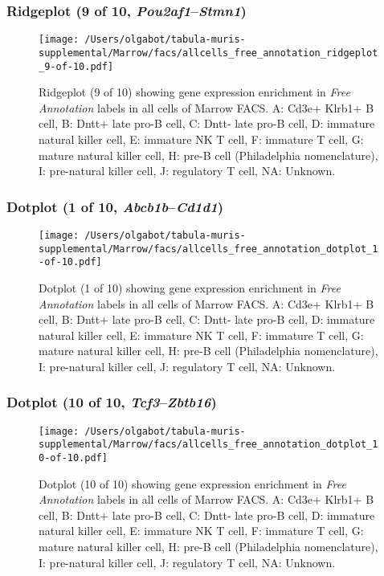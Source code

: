 \clearpage

\subsubsection{Ridgeplot (9 of 10, \emph{Pou2af1}--\emph{Stmn1})}
\begin{figure}[h]
\centering
\texttt{[image: /Users/olgabot/tabula-muris-supplemental/Marrow/facs/allcells\_free\_annotation\_ridgeplot\_9-of-10.pdf]}

\caption{ Ridgeplot (9 of 10)  showing gene expression enrichment in \emph{Free Annotation} labels in all cells of Marrow FACS. A: Cd3e+ Klrb1+ B cell, B: Dntt+ late pro-B cell, C: Dntt- late pro-B cell, D: immature natural killer cell, E: immature NK T cell, F: immature T cell, G: mature natural killer cell, H: pre-B cell (Philadelphia nomenclature), I: pre-natural killer cell, J: regulatory T cell, NA: Unknown.}
\end{figure}


\clearpage

\subsubsection{Dotplot (1 of 10, \emph{Abcb1b}--\emph{Cd1d1})}
\begin{figure}[h]
\centering
\texttt{[image: /Users/olgabot/tabula-muris-supplemental/Marrow/facs/allcells\_free\_annotation\_dotplot\_1-of-10.pdf]}

\caption{ Dotplot (1 of 10)  showing gene expression enrichment in \emph{Free Annotation} labels in all cells of Marrow FACS. A: Cd3e+ Klrb1+ B cell, B: Dntt+ late pro-B cell, C: Dntt- late pro-B cell, D: immature natural killer cell, E: immature NK T cell, F: immature T cell, G: mature natural killer cell, H: pre-B cell (Philadelphia nomenclature), I: pre-natural killer cell, J: regulatory T cell, NA: Unknown.}
\end{figure}


\clearpage

\subsubsection{Dotplot (10 of 10, \emph{Tcf3}--\emph{Zbtb16})}
\begin{figure}[h]
\centering
\texttt{[image: /Users/olgabot/tabula-muris-supplemental/Marrow/facs/allcells\_free\_annotation\_dotplot\_10-of-10.pdf]}

\caption{ Dotplot (10 of 10)  showing gene expression enrichment in \emph{Free Annotation} labels in all cells of Marrow FACS. A: Cd3e+ Klrb1+ B cell, B: Dntt+ late pro-B cell, C: Dntt- late pro-B cell, D: immature natural killer cell, E: immature NK T cell, F: immature T cell, G: mature natural killer cell, H: pre-B cell (Philadelphia nomenclature), I: pre-natural killer cell, J: regulatory T cell, NA: Unknown.}
\end{figure}


